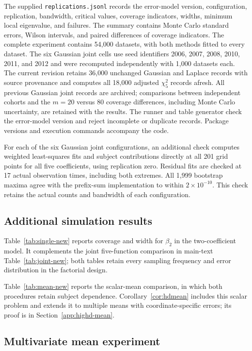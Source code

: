The supplied \texttt{replications.jsonl} records the error-model version, configuration, replication, bandwidth, critical values, coverage indicators, widths, minimum local eigenvalue, and failures. The summary contains Monte Carlo standard errors, Wilson intervals, and paired differences of coverage indicators. The complete experiment contains 54,000 datasets, with both methods fitted to every dataset. The six Gaussian joint cells use seed identifiers 2006, 2007, 2008, 2010, 2011, and 2012 and were recomputed independently with 1,000 datasets each. The current revision retains 36,000 unchanged Gaussian and Laplace records with source provenance and computes all 18,000 adjusted $\chi^2_5$ records afresh. All previous Gaussian joint records are archived; comparisons between independent cohorts and the $m=20$ versus 80 coverage differences, including Monte Carlo uncertainty, are retained with the results. The runner and table generator check the error-model version and reject incomplete or duplicate records. Package versions and execution commands accompany the code.

For each of the six Gaussian joint configurations, an additional check computes weighted least-squares fits and subject contributions directly at all 201 grid points for all five coefficients, using replication zero. Residual fits are checked at 17 actual observation times, including both extremes. All 1,999 bootstrap maxima agree with the prefix-sum implementation to within $2\times10^{-10}$. This check retains the actual counts and bandwidth of each configuration.

\subsection{Additional simulation results}\label{app:single-comparison}
Table~\ref{tab:single-new} reports coverage and width for $\beta_2$ in the two-coefficient model. It complements the joint five-function comparison in main-text Table~\ref{tab:joint-new}; both tables retain every sampling frequency and error distribution in the factorial design.

Table~\ref{tab:mean-new} reports the scalar-mean comparison, in which both procedures retain subject dependence. Corollary~\ref{cor:hdmean} includes this scalar problem and extends it to multiple means with coordinate-specific errors; its proof is in Section~\ref{app:highd-mean}.


\FloatBarrier

\subsection{Multivariate mean experiment}\label{app:highd-mean-simulation}

